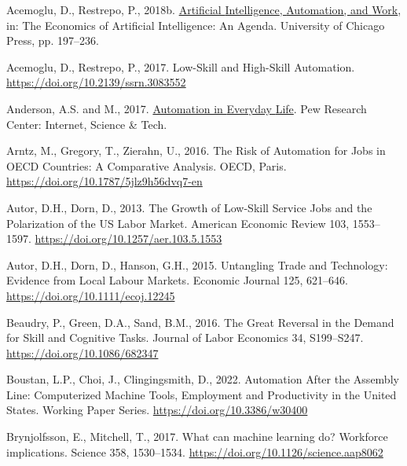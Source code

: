 \documentclass[
  11,
  a4paperpaper,
]{article}
\newlength{\cslhangindent}
\newenvironment{CSLReferences}[2] %
 {\begin{list}{}{%
  \setlength{\itemindent}{0pt}
  \setlength{\leftmargin}{0pt}
  \setlength{\parsep}{0pt}
  \ifodd #1
   \setlength{\leftmargin}{\cslhangindent}
   \setlength{\itemindent}{-1\cslhangindent}
  \fi
  \setlength{\itemsep}{#2\baselineskip}}}
 {\end{list}}
\begin{document}
\begin{CSLReferences}{1}{0}
Acemoglu, D., Restrepo, P., 2018b.
\href{https://www.nber.org/books-and-chapters/economics-artificial-intelligence-agenda/artificial-intelligence-automation-and-work}{Artificial
{Intelligence}, {Automation}, and {Work}}, in: The {Economics} of
{Artificial} {Intelligence}: {An} {Agenda}. University of Chicago Press,
pp. 197--236.

Acemoglu, D., Restrepo, P., 2017. Low-{Skill} and {High}-{Skill}
{Automation}. \url{https://doi.org/10.2139/ssrn.3083552}

Anderson, A.S. and M., 2017.
\href{https://www.pewresearch.org/internet/2017/10/04/automation-in-everyday-life/}{Automation
in {Everyday} {Life}}. Pew Research Center: Internet, Science \& Tech.

Arntz, M., Gregory, T., Zierahn, U., 2016. The {Risk} of {Automation}
for {Jobs} in {OECD} {Countries}: {A} {Comparative} {Analysis}. OECD,
Paris. \url{https://doi.org/10.1787/5jlz9h56dvq7-en}

Autor, D.H., Dorn, D., 2013. The {Growth} of {Low}-{Skill} {Service}
{Jobs} and the {Polarization} of the {US} {Labor} {Market}. American
Economic Review 103, 1553--1597.
\url{https://doi.org/10.1257/aer.103.5.1553}

Autor, D.H., Dorn, D., Hanson, G.H., 2015. Untangling {Trade} and
{Technology}: {Evidence} from {Local} {Labour} {Markets}. Economic
Journal 125, 621--646. \url{https://doi.org/10.1111/ecoj.12245}

Beaudry, P., Green, D.A., Sand, B.M., 2016. The {Great} {Reversal} in
the {Demand} for {Skill} and {Cognitive} {Tasks}. Journal of Labor
Economics 34, S199--S247. \url{https://doi.org/10.1086/682347}

Boustan, L.P., Choi, J., Clingingsmith, D., 2022. Automation {After} the
{Assembly} {Line}: {Computerized} {Machine} {Tools}, {Employment} and
{Productivity} in the {United} {States}. Working {Paper} {Series}.
\url{https://doi.org/10.3386/w30400}

Brynjolfsson, E., Mitchell, T., 2017. What can machine learning do?
{Workforce} implications. Science 358, 1530--1534.
\url{https://doi.org/10.1126/science.aap8062}


\end{CSLReferences}
\end{document}
